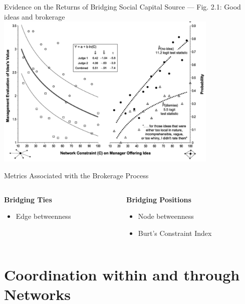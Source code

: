 \documentclass[aspectratio=1610]{beamer}
\begin{document}
\begin{frame}{Evidence on the Returns of Bridging Social Capital}
	{Source \cite{burt2007} --- Fig. 2.1: Good ideas and brokerage}
	\centering
	\includegraphics[width=0.8\textwidth]{images/good_ideas.png}
\end{frame}

\begin{frame}{Metrics Associated with the Brokerage Process}
	\begin{columns}[t]
		\begin{column}{0.5\textwidth}
			\textbf{Bridging Ties}
			\begin{itemize}
				\item Edge betweenness
			\end{itemize}
		\end{column}
		\begin{column}{0.5\textwidth}
			\textbf{Bridging Positions}
			\begin{itemize}
				\item Node betweenness
				\item Burt's Constraint Index
			\end{itemize}
		\end{column}
	\end{columns}
\end{frame}

\section{Coordination within and through Networks}
\end{document}

